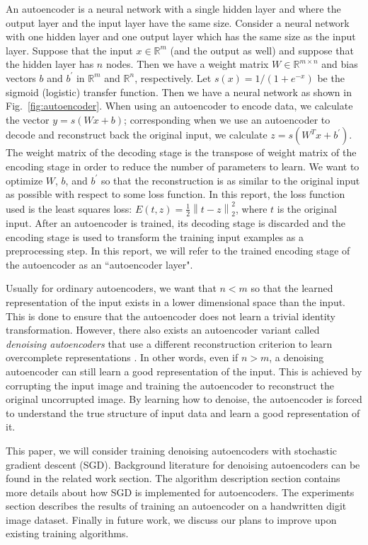 \documentclass[conference]{IEEEtran}
\newcommand{\norm}[1]{\left\lVert #1 \right\rVert}
\begin{document}
An autoencoder is a neural network with a single hidden layer and where the output layer and the input layer have the same size. Consider a neural network with one hidden layer and one output layer which has the same size as the input layer. Suppose that the input $x\in\mathbb{R}^m$ (and the output as well) and suppose that the hidden layer has $n$ nodes. Then we have a weight matrix $W\in\mathbb{R}^{m\times n}$ and bias vectors $b$ and $b^{'}$ in $\mathbb{R}^m$ and $\mathbb{R}^n$, respectively. Let $s(x) = 1/(1+e^{-x})$ be the sigmoid (logistic) transfer function. Then we have a neural network as shown in Fig.~\ref{fig:autoencoder}. When using an autoencoder to encode data, we calculate the vector $y=s(Wx + b)$; corresponding when we use an autoencoder to decode and reconstruct back the original input, we calculate $z=s(W^{T}x+b^{'})$. The weight matrix of the decoding stage is the transpose of weight matrix of the encoding stage in order to reduce the number of parameters to learn. We want to optimize $W$, $b$, and $b^{'}$ so that the reconstruction is as similar to the original input as possible with respect to some loss function. In this report, the loss function used is the least squares loss: $E(t,z)=\frac{1}{2}\norm{t-z}_2^2$, where $t$ is the original input. After an autoencoder is trained, its decoding stage is discarded and the encoding stage is used to transform the training input examples as a preprocessing step. In this report, we will refer to the trained encoding stage of the autoencoder as an ``autoencoder layer".  

Usually for ordinary autoencoders, we want that $n<m$ so that the learned representation of the input exists in a lower dimensional space than the input. This is done to ensure that the autoencoder does not learn a trivial identity transformation. However, there also exists an autoencoder variant called \textit{denoising autoencoders} that use a different reconstruction criterion to learn overcomplete representations \cite{vincent2010stacked}. In other words, even if $n>m$, a denoising autoencoder can still learn a good representation of the input. This is achieved by corrupting the input image and training the autoencoder to reconstruct the original uncorrupted image. By learning how to denoise, the autoencoder is forced to understand the true structure of input data and learn a good representation of it. 

This paper, we will consider training denoising autoencoders with stochastic gradient descent (SGD). Background literature for denoising autoencoders can be found in the related work section. The algorithm description section contains more details about how SGD is implemented for autoencoders. The experiments section describes the results of training an autoencoder on a handwritten digit image dataset. Finally in future work, we discuss our plans to improve upon existing training algorithms.
\end{document}

